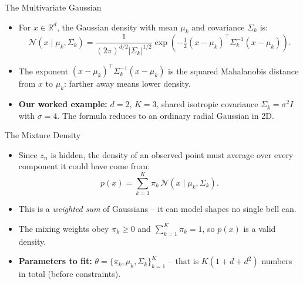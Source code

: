 \begin{frame}{The Multivariate Gaussian}
\begin{itemize}
  \item For $x \in \mathbb{R}^d$, the Gaussian density with mean $\mu_k$ and covariance $\Sigma_k$ is:
  \begin{equation}
    \mathcal{N}(x \mid \mu_k, \Sigma_k)
    = \frac{1}{(2\pi)^{d/2}|\Sigma_k|^{1/2}}
    \exp\!\left(-\tfrac{1}{2}(x - \mu_k)^{\!\top}\Sigma_k^{-1}(x - \mu_k)\right).
    \label{eq:gaussian-multivariate}
  \end{equation}
  \pause
  \item The exponent $(x - \mu_k)^{\!\top}\Sigma_k^{-1}(x - \mu_k)$ is the squared Mahalanobis distance from $x$ to $\mu_k$: farther away means lower density.
  \pause
  \item \textbf{Our worked example:} $d = 2$, $K = 3$, shared isotropic covariance $\Sigma_k = \sigma^2 I$ with $\sigma = 4$.  The formula reduces to an ordinary radial Gaussian in 2D.
\end{itemize}
\end{frame}

\begin{frame}{The Mixture Density}
\begin{itemize}
  \item Since $z_n$ is hidden, the density of an observed point must average over every component it could have come from:
  \begin{equation}
    p(x) = \sum_{k=1}^{K} \pi_k\,\mathcal{N}(x \mid \mu_k, \Sigma_k).
    \label{eq:gmm-density}
  \end{equation}
  \pause
  \item This is a \emph{weighted sum} of Gaussians -- it can model shapes no single bell can.
  \pause
  \item The mixing weights obey $\pi_k \geq 0$ and $\sum_{k=1}^{K}\pi_k = 1$, so $p(x)$ is a valid density.
  \pause
  \item \textbf{Parameters to fit:} $\theta = \{\pi_k, \mu_k, \Sigma_k\}_{k=1}^K$ -- that is $K(1 + d + d^2)$ numbers in total (before constraints).
\end{itemize}
\end{frame}

